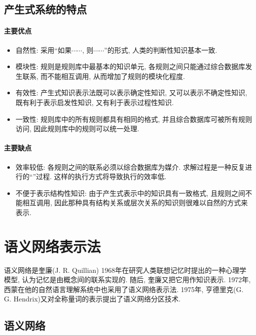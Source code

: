 \subsection{产生式系统的特点}
\paragraph{主要优点}
\begin{itemize}
\item 自然性: 采用“如果$\cdots\cdots$, 则$\cdots\cdots$”的形式, 人类的判断性知识基本一致.
\item 模块性: 规则是规则库中最基本的知识单元, 各规则之间只能通过综合数据库发生联系, 而不能相互调用, 从而增加了规则的模块化程度.
\item 有效性: 产生式知识表示法既可以表示确定性知识, 又可以表示不确定性知识, 既有利于表示启发性知识, 又有利于表示过程性知识.
\item 一致性: 规则库中的所有规则都具有相同的格式, 并且综合数据库可被所有规则访问, 因此规则库中的规则可以统一处理.
\end{itemize}
\paragraph{主要缺点}
\begin{itemize}
\item 效率较低: 各规则之间的联系必须以综合数据库为媒介. 求解过程是一种反复进行的“”过程. 这样的执行方式将导致执行的效率低.
\item 不便于表示结构性知识: 由于产生式表示中的知识具有一致格式, 且规则之间不能相互调用, 因此那种具有结构关系或层次关系的知识则很难以自然的方式来表示.
\end{itemize}
\section{语义网络表示法}
语义网络是奎廉(J. R. Quillian) 1968年在研究人类联想记忆时提出的一种心理学模型, 认为记忆是由概念间的联系实现的.
随后, 奎廉又把它用作知识表示.
1972年, 西蒙在他的自然语言理解系统中也采用了语义网络表示法.
1975年, 亨德里克(G. G. Hendrix)又对全称量词的表示提出了语义网络分区技术.
\subsection{语义网络}
